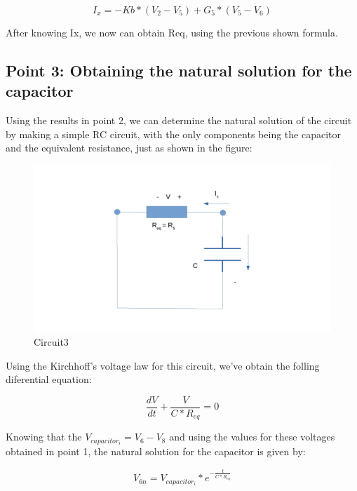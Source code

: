 \setlength{\parskip}{1em}

\begin{equation}
I_x = -Kb*(V_2 - V_5) + G_5*(V_5 - V_6) 
\end{equation}

After knowing Ix, we now can obtain Req, using the previous shown formula.

\subsection{Point 3: Obtaining the natural solution for the capacitor}

Using the results in point 2, we can determine the natural solution of the circuit by making a simple RC circuit, with the only components being the capacitor and the equivalent resistance, just as shown in the figure:

\begin{figure}[H]
\centering
\includegraphics[width = 15cm]{circuit3.pdf}
\caption {Circuit3}
\end{figure}

Using the Kirchhoff's voltage law for this circuit, we've obtain the folling diferential equation:

\begin{equation}
\frac{dV}{dt} + \frac{V}{C*R_{eq}} = 0
\end{equation}

Knowing that the $V_{capacitor_i} = V_{6} - V_{8}$ and using the values for these voltages obtained in point 1, the natural solution for the capacitor is given by:

\begin{equation}
V_{6n} = V_{capacitor_i} * e^{-\frac{t}{C*R_{eq}}}
\end{equation}

